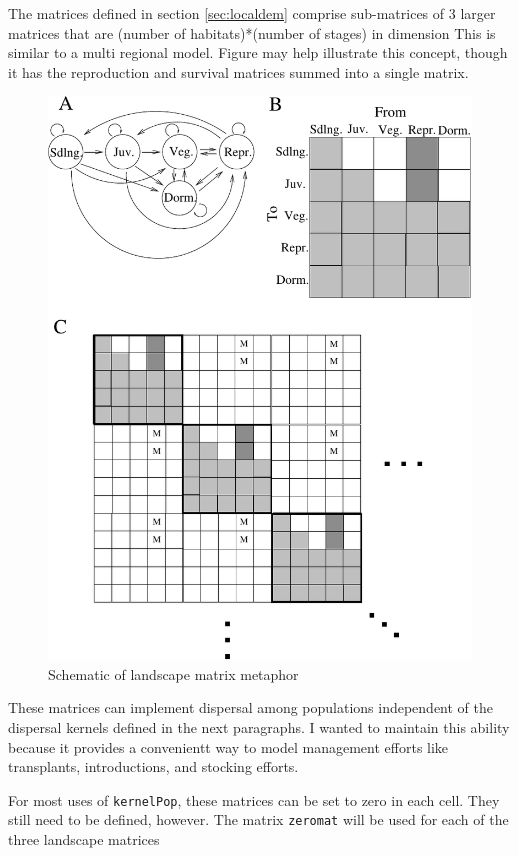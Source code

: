 \documentclass[10pt]{article}
\newcommand{\KP}{\texttt{kernelPop}}
\newcommand{\code}[1]{\texttt{#1}}
\begin{document}
The matrices defined in section \ref{sec:localdem} comprise
sub-matrices of 3 larger matrices that are (number of habitats)*(number
of stages) in dimension This is similar to a multi regional model.
Figure may help illustrate this concept, though it has the
reproduction and survival matrices summed into a single matrix.  
\begin{figure}
  \centering
  \includegraphics{metamarkov.pdf}
  \caption{Schematic of landscape matrix metaphor}
  \label{fig:landmat}
\end{figure}

These matrices can implement dispersal among populations independent
of the dispersal kernels defined in the next paragraphs.  I wanted to
maintain this ability because it provides a convenientt way to model
management efforts like transplants, introductions, and stocking efforts.

For most uses of \KP, these matrices can be set to zero in each cell.
They still need to be defined, however.  The matrix \code{zeromat}
will be used for each of the three landscape matrices
\end{document}
